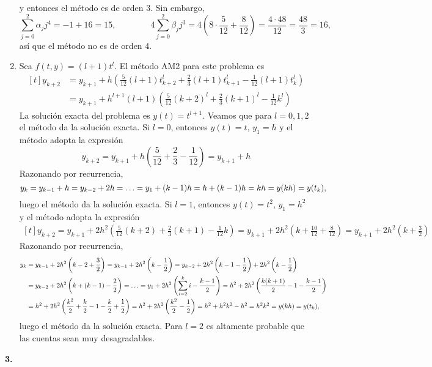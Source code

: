 \documentclass[11pt]{report}
\begin{document}
\begin{enumerate}
  y entonces el método es de orden $3$. Sin embargo,
  \[\sum_{j=0}^2 \alpha_jj^4 = -1+16 = 15, \qquad \qquad 4\sum_{j=0}^2 \beta_jj^3 = 4\left(8\cdot \frac{5}{12}+\frac{8}{12}\right) = \frac{4 \cdot 48}{12} = \frac{48}{3} = 16,\]
  así que el método no es de orden $4$.
  \item Sea $f(t,y)=(l+1)t^l$. El método AM2 para este problema es 
  \[
  \begin{aligned}[t]
    y_{k+2}&=y_{k+1}+h\left(\frac{5}{12}(l+1)t_{k+2}^l+\frac{2}{3}(l+1)t_{k+1}^l -\frac{1}{12}(l+1)t_k^l\right) \\ &= y_{k+1}+h^{l+1}(l+1)\left(\frac{5}{12}(k+2)^l+\frac{2}{3}(k+1)^l -\frac{1}{12}k^l\right)
  \end{aligned}
  \]
  La solución exacta del problema es $y(t)=t^{l+1}$. Veamos que para $l=0,1,2$ el método da la solución exacta. Si $l = 0$, entonces $y(t)=t$, $y_1 = h$ y el método adopta la expresión
  \[y_{k+2}=y_{k+1}+h\left(\frac{5}{12}+\frac{2}{3} -\frac{1}{12}\right) = y_{k+1}+h\]
  Razonando por recurrencia,
  \[y_k = y_{k-1}+h = y_{k-2}+2h = \mathellipsis = y_1+(k-1)h =  h+(k-1)h = kh = y(kh) = y(t_k),\]
  luego el método da la solución exacta. Si $l = 1$, entonces $y(t)=t^2$, $y_1 = h^2$ y el método adopta la expresión
  \[\begin{aligned}[t]
    y_{k+2}=y_{k+1}+2h^2\left(\frac{5}{12}(k+2)+\frac{2}{3}(k+1)-\frac{1}{12}k\right) = y_{k+1}+2h^2\left(k +\frac{10}{12}+\frac{8}{12}\right) = y_{k+1}+2h^2\left(k +\frac{3}{2}\right)
  \end{aligned}
    \]
  Razonando por recurrencia,
  \[
  \begin{aligned}[t]
    y_k &= y_{k-1}+2h^2\left(k-2+\frac{3}{2}\right) =  y_{k-1}+2h^2\left(k-\frac{1}{2}\right) = y_{k-2}+2h^2\left(k-1-\frac{1}{2} \right)+2h^2\left(k-\frac{1}{2}\right) \\
    &= y_{k-2}+2h^2\left(k+(k-1)-\frac{2}{2}\right) = \mathellipsis = y_1+2h^2\left(\sum_{i=2}^k i -\frac{k-1}{2}\right) = h^2+2h^2\left(\frac{k(k+1)}{2}-1 -\frac{k-1}{2}\right) \\
    &=  h^2+2h^2\left(\frac{k^2}{2}+\frac{k}{2}-1-\frac{k}{2}+\frac{1}{2}\right) =  h^2+2h^2\left(\frac{k^2}{2}-\frac{1}{2}\right) = h^2+h^2k^2-h^2 = h^2k^2 = y(kh) = y(t_k),
  \end{aligned}
 \]
 luego el método da la solución exacta. Para $l = 2$ es altamente probable que las cuentas sean muy desagradables.
\end{enumerate}

\textbf{3. }
\end{document}
